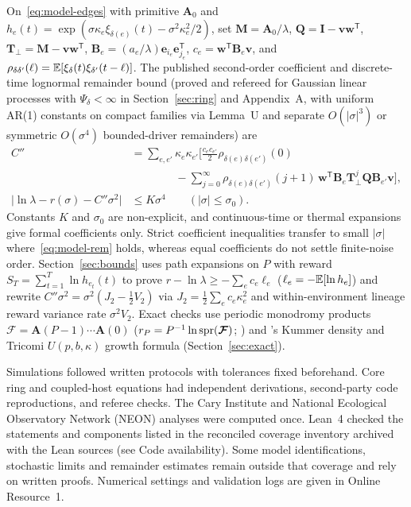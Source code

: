 On~\eqref{eq:model-edges} with primitive $\mathbf{A}_0$ and $h_e(t) = \exp(\sigma \kappa_e \xi_{\delta(e)}(t) - \sigma^2 \kappa_e^2/2)$, set $\mathbf{M} = \mathbf{A}_0/\lambda$, $\mathbf{Q} = \mathbf{I} - \mathbf{v}\mathbf{w}^{\mathsf{T}}$, $\mathbf{T}_\perp = \mathbf{M} - \mathbf{v}\mathbf{w}^{\mathsf{T}}$, $\mathbf{B}_e = (a_e/\lambda)\mathbf{e}_{i_e}\mathbf{e}_{j_e}^{\mathsf{T}}$, $c_e = \mathbf{w}^{\mathsf{T}}\mathbf{B}_e\mathbf{v}$, and $\rho_{\delta\delta'}(\ell) = \mathbb{E}[\xi_\delta(t)\xi_{\delta'}(t-\ell)]$. The published second-order coefficient \citep{ruelle1979,tuljapurkar1982a,tuljapurkar2006} and discrete-time lognormal remainder bound (proved and refereed for Gaussian linear processes with $\Psi_\delta < \infty$ in Section~\ref{sec:ring} and Appendix~A, with uniform AR(1) constants on compact families via Lemma~U and separate $O(|\sigma|^3)$ or symmetric $O(\sigma^4)$ bounded-driver remainders) are
\begin{align}
C'' &= \sum_{e,e'} \kappa_e \kappa_{e'}\biggl[\frac{c_e c_{e'}}{2}\rho_{\delta(e)\delta(e')}(0) \nonumber\\
&\qquad\qquad - \sum_{j=0}^{\infty} \rho_{\delta(e)\delta(e')}(j+1)\,\mathbf{w}^{\mathsf{T}}\mathbf{B}_e \mathbf{T}_\perp^j \mathbf{Q}\mathbf{B}_{e'}\mathbf{v}\biggr], \label{eq:model-c2}\\
\bigl|\ln\lambda - r(\sigma) - C''\sigma^2\bigr| &\le K\sigma^4 \qquad (|\sigma| \le \sigma_0). \label{eq:model-rem}
\end{align}
Constants $K$ and $\sigma_0$ are non-explicit, and continuous-time or thermal expansions give formal coefficients only. Strict coefficient inequalities transfer to small $|\sigma|$ where~\eqref{eq:model-rem} holds, whereas equal coefficients do not settle finite-noise order. Section~\ref{sec:bounds} uses path expansions on $P$ with reward $S_T = \sum_{t=1}^T \ln h_{e_t}(t)$ to prove $r - \ln\lambda \ge -\sum_e c_e \ell_e$ ($\ell_e = -\mathbb{E}[\ln h_e]$) and rewrite $C''\sigma^2 = \sigma^2(J_2 - \tfrac{1}{2}V_2)$ via $J_2 = \tfrac{1}{2}\sum_e c_e \kappa_e^2$ and within-environment lineage reward variance rate $\sigma^2 V_2$. Exact checks use periodic monodromy products $\boldsymbol{\mathcal{F}} = \mathbf{A}(P-1)\cdots\mathbf{A}(0)$ ($r_P = P^{-1}\ln\operatorname{spr}(\boldsymbol{\mathcal{F}})$; \citealp{bacaer2007}) and \citet{roerdink1988}'s Kummer density and Tricomi $U(p, b, \kappa)$ growth formula (Section~\ref{sec:exact}).

Simulations followed written protocols with tolerances fixed beforehand. Core ring and coupled-host equations had independent derivations, second-party code reproductions, and referee checks. The Cary Institute and National Ecological Observatory Network (NEON) analyses were computed once. Lean~4 checked the statements and components listed in the reconciled coverage inventory archived with the Lean sources (see Code availability). Some model identifications, stochastic limits and remainder estimates remain outside that coverage and rely on written proofs. Numerical settings and validation logs are given in Online Resource~1.

